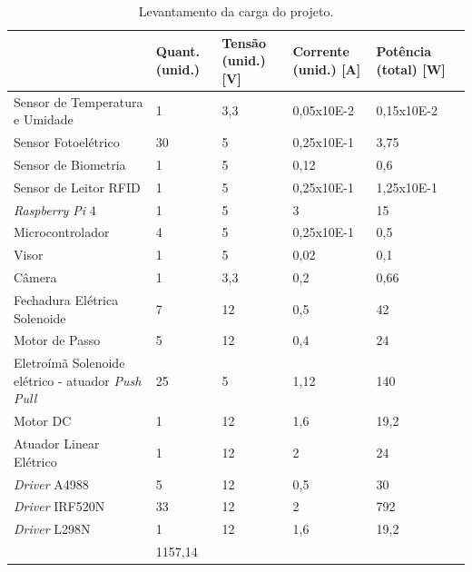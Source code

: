 \begin{table}[htb]
    \centering
    \caption{Levantamento da carga do projeto.}
    \label{fig:energia_carga}
    \begin{adjustbox}{max width = \textwidth}
        \begin{tabular}{|L{5cm}|C{2cm}|C{2cm}|C{2cm}|C{2cm}|C{2cm}|}
            \hline
            & \textbf{Quant. (unid.)} & \textbf{Tensão (unid.) [V]} & \textbf{Corrente (unid.) [A]} & \textbf{Potência (total) [W]} \\ \hline
            Sensor de Temperatura e Umidade & 1	 & 3,3 & 0,05x10E-2 & 0,15x10E-2
            \\ \hline
              Sensor Fotoelétrico & 30	 & 5  & 0,25x10E-1 & 3,75
             \\ \hline
             Sensor de Biometria & 1 & 5 & 0,12 & 0,6
             \\ \hline
             Sensor de Leitor RFID & 1	 & 5 & 0,25x10E-1 & 1,25x10E-1
             \\ \hline
              \textit{Raspberry Pi} 4 & 1 & 5 & 3 & 15
             \\ \hline
               Microcontrolador & 4 & 5 & 0,25x10E-1 & 0,5
             \\ \hline
               Visor & 1 & 5 & 0,02 & 0,1
             \\ \hline
               Câmera & 1 & 3,3 & 0,2 & 0,66
             \\ \hline
              Fechadura Elétrica Solenoide & 7 & 12 & 0,5 & 42
             \\ \hline
              Motor de Passo & 5 & 12 & 0,4 & 24
             \\ \hline
              Eletroímã Solenoide elétrico - atuador \textit{Push Pull} & 25 & 5 & 1,12 & 140
             \\ \hline
                Motor DC & 1 & 12 & 1,6 & 19,2
             \\ \hline
                Atuador Linear Elétrico & 1 & 12 & 2 & 24
             \\ \hline
               \textit{Driver} A4988 & 5 & 12 & 0,5 & 30
             \\ \hline
                \textit{Driver} IRF520N & 33 & 12 & 2 & 792
             \\ \hline
                  \textit{Driver} L298N & 1 & 12 & 1,6 & 19,2
             \\ \hline
              & 1157,14 \\
             \hline
        \end{tabular}
    \end{adjustbox}
\end{table}


